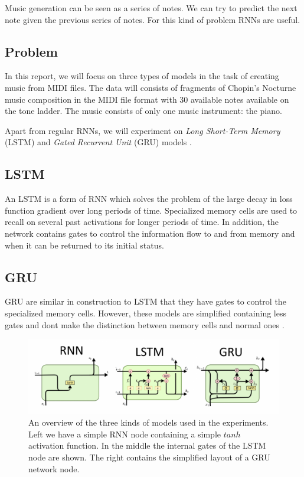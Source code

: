 \documentclass[11pt]
{article}
\begin{document}
Music generation can be seen as a series of notes. We can try to predict the next note given the previous series of notes.
For this kind of problem RNNs are useful.

\subsection{Problem}
In this report, we will focus on three types of models in the task of creating music from MIDI files. The data will consists of fragments of Chopin's Nocturne music composition in the MIDI file format with 30 available notes available on the tone ladder. The music consists of only one music instrument: the piano.

Apart from regular RNNs, we will experiment on \textit{Long Short-Term Memory} (LSTM)\cite{Hochreiter:1997:LSM:1246443.1246450} and \textit{Gated Recurrent Unit } (GRU) models \cite{Cho}.

\subsection{LSTM}
An LSTM is a form of RNN which solves the problem of the large decay in loss function gradient over long periods of time. Specialized memory cells are used to recall on several past activations for longer periods of time. In addition, the network contains gates to control the information flow to and from memory and when it can be returned to its initial status.

\subsection{GRU}
GRU are similar in construction to LSTM that they have gates to control the specialized memory cells. However, these models are simplified containing less gates and dont make the distinction between memory cells and normal ones \cite{Chung}.

\begin{figure}[H]
	\includegraphics[width=\linewidth]{comp.png}
	\caption{An overview of the three kinds of models used in the experiments. Left we have a simple RNN node containing a simple $tanh$ activation function. In the middle the internal gates of the LSTM node are shown. The right contains the simplified layout of a GRU network node.}
	\label{fig:fig1}
\end{figure}
\end{document}
